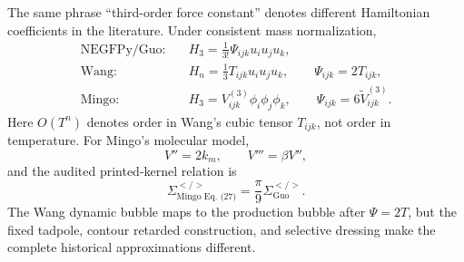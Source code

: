 \documentclass[11pt]{article}
\renewcommand{\_}{\OriginalTextUnderscore\allowbreak}
\begin{document}
The same phrase ``third-order force constant'' denotes different Hamiltonian
coefficients in the literature. Under consistent mass normalization,
\begin{align}
\text{NEGFPy/Guo:}\quad&
H_3=\frac{1}{3!}\Psi_{ijk}u_i u_j u_k,\\
\text{Wang:}\quad&
H_n=\frac{1}{3}T_{ijk}u_i u_j u_k,
\qquad \Psi_{ijk}=2T_{ijk},\\
\text{Mingo:}\quad&
H_3=V^{(3)}_{ijk}\phi_i\phi_j\phi_k,
\qquad \Psi_{ijk}=6\widetilde V^{(3)}_{ijk}.
\end{align}
Here \(O(T^n)\) denotes order in Wang's cubic tensor \(T_{ijk}\), not order
in temperature.
For Mingo's molecular model,
\begin{equation}
V''=2k_m,\qquad V'''=\beta V'',
\end{equation}
and the audited printed-kernel relation is
\begin{equation}
\Sigma_{\text{Mingo Eq.~(27)}}^{</>}=
\frac{\pi}{9}\Sigma_{\text{Guo}}^{</>}.
\label{eq:mingo-map}
\end{equation}
The Wang dynamic bubble maps to the production bubble after \(\Psi=2T\), but
the fixed tadpole, contour retarded construction, and selective dressing make
the complete historical approximations different.
\end{document}
